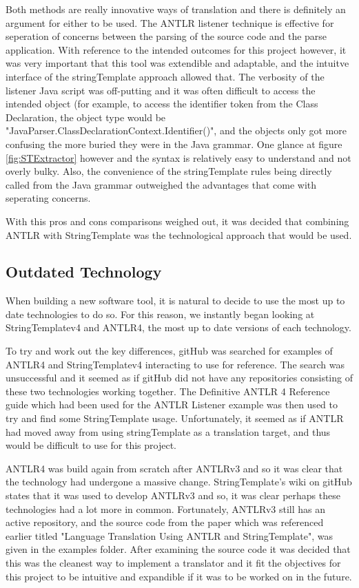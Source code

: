 \documentclass{l4proj}
\begin{document}
Both methods are really innovative ways of translation and there is definitely an argument for either to be used. The ANTLR listener technique is effective for seperation of concerns between the parsing of the source code and the parse application. With reference to the intended outcomes for this project however, it was very important that this tool was extendible and adaptable, and the intuitve interface of the stringTemplate approach allowed that. The verbosity of the listener Java script was off-putting and it was often difficult to access the intended object (for example, to access the identifier token from the Class Declaration, the object type would be "JavaParser.ClassDeclarationContext.Identifier()", and the objects only got more confusing the more buried they were in the Java grammar. One glance at figure \ref{fig:STExtractor} however and the syntax is relatively easy to understand and not overly bulky. Also, the convenience of the stringTemplate rules being directly called from the Java grammar outweighed the advantages that come with seperating concerns.

With this pros and cons comparisons weighed out, it was decided that combining ANTLR with StringTemplate was the technological approach that would be used.

\subsection{Outdated Technology}
When building a new software tool, it is natural to decide to use the most up to date technologies to do so. For this reason, we instantly began looking at StringTemplatev4 and ANTLR4, the most up to date versions of each technology.

To try and work out the key differences, gitHub was searched for examples of ANTLR4 and StringTemplatev4 interacting to use for reference. The search was unsuccessful and it seemed as if gitHub did not have any repositories consisting of these two technologies working together. The Definitive ANTLR 4 Reference guide which had been used for the ANTLR Listener example was then used to try and find some StringTemplate usage. Unfortunately, it seemed as if ANTLR had moved away from using stringTemplate as a translation target, and thus would be difficult to use for this project.

ANTLR4 was build again from scratch after ANTLRv3 and so it was clear that the technology had undergone a massive change. StringTemplate's wiki on gitHub states that it was used to develop ANTLRv3 and so, it was clear perhaps these technologies had a lot more in common. Fortunately, ANTLRv3 still has an active repository, and the source code from the paper which was referenced earlier titled "Language Translation Using ANTLR and StringTemplate", was given in the examples folder. After examining the source code it was decided that this was the cleanest way to implement a translator and it fit the objectives for this project to be intuitive and expandible if it was to be worked on in the future. 
\end{document}
